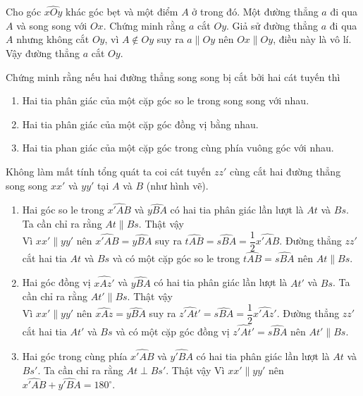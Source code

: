 \begin{bt}%
	Cho góc $\widehat{xOy}$ khác góc bẹt và một điểm $A$ ở trong đó. Một đường thẳng $a$ đi qua $A$ và song song với $Ox$. Chứng minh rằng $a$ cắt $Oy$.
	\loigiai
	{
		Giả sử đường thẳng $a$ đi qua $A$ nhưng không cắt $Oy$, vì $A\not \in Oy $ suy ra $a\parallel Oy$ nên $Ox\parallel Oy$, điều này là vô lí.\\
		Vậy đường thẳng $a$ cắt $Oy$.
	}
\end{bt}
\begin{bt}%
	Chứng minh rằng nếu hai đường thẳng song song bị cắt bởi hai cát tuyến thì
	\begin{enumerate}
		\item Hai tia phân giác của một cặp góc so le trong song song với nhau.
		\item Hai tia phân giác của một cặp góc đồng vị bằng nhau.
		\item Hai tia phan giác của một cặp góc trong cùng phía vuông góc với nhau.
	\end{enumerate}
	\loigiai
	{
		Không làm mất tính tổng quát ta coi cát tuyến $zz'$ cùng cắt hai đường thẳng song song $xx'$ và $yy'$ tại $A$ và $B$ (như hình vẽ).
		\begin{enumerate}
			\item Hai góc so le trong $\widehat{x'AB}$ và $\widehat{yBA}$ có hai tia phân giác lần lượt là $At$ và $Bs$. Ta cần chỉ ra rằng $At\parallel Bs$. Thật vậy\\
			Vì $xx'\parallel yy'$ nên $\widehat{x'AB}=\widehat{yBA}$ suy ra $\widehat{tAB}=\widehat{sBA}=\dfrac{1}{2}\widehat{x'AB}$. Đường thẳng $zz'$ cắt hai tia $At$ và $Bs$ và có một cặp góc so le trong $\widehat{tAB}=\widehat{sBA}$ nên $At\parallel Bs$.
			\item Hai góc đồng vị $\widehat{xAz'}$ và $\widehat{yBA}$ có hai tia phân giác lần lượt là $At'$ và $Bs$. Ta cần chỉ ra rằng $At'\parallel Bs$. Thật vậy\\
			Vì $xx'\parallel yy'$ nên $\widehat{xAz}=\widehat{yBA}$ suy ra $\widehat{z'At'}=\widehat{sBA}=\dfrac{1}{2}\widehat{x'Az'}$. Đường thẳng $zz'$ cắt hai tia $At'$ và $Bs$ và có một cặp góc đồng vị $\widehat{z'At'}=\widehat{sBA}$ nên $At'\parallel Bs$.
			\item Hai góc trong cùng phía $\widehat{x'AB}$ và $\widehat{y'BA}$ có hai tia phân giác lần lượt là $At$ và $Bs'$. Ta cần chỉ ra rằng $At\perp Bs'$. Thật vậy
			\immini
			{Vì $xx'\parallel yy'$ nên $\widehat{x'AB}+\widehat{y'BA}=180^\circ$.\\
}
\end{enumerate}}
\end{bt}
